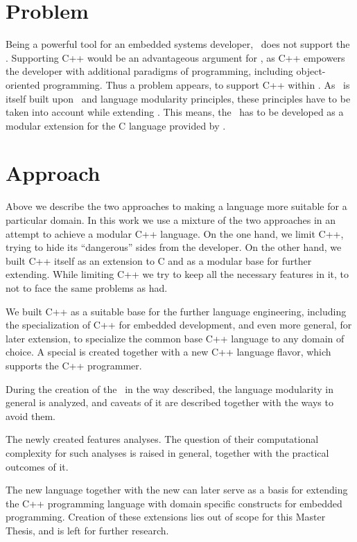 \section{Problem}

Being a powerful tool for an embedded systems developer, \mbdr\ does not support the \cpppl. Supporting C++ would be an
advantageous argument for \mbdr, as C++ empowers the developer with additional paradigms of programming, including 
object-oriented programming. Thus a problem appears, to support C++ within \mbdr. As \mbdr\ is itself built upon
\jbmps\ and language modularity principles, these principles have to be taken into account while extending \mbdr.
This means, the \cpppl\ has to be developed as a modular extension for the C language provided by \mbdr.


\section{Approach}

Above we describe the two approaches to making a language more suitable for a particular domain. In this work we use a mixture of 
the two approaches in an  attempt to achieve a modular C++ language. On the one hand, we limit C++, trying to hide its ``dangerous'' sides 
from the developer. On the other hand, we built C++ itself as an extension to C and as a modular base for further extending. While limiting 
C++ we try to keep all the necessary features in it, to not to face the same problems as  had.

We built C++ as a suitable base for the further language engineering, including the specialization  of C++ for embedded development, 
and even more general, for later extension, to specialize the common base C++ language to any domain of choice. A special  is created 
together with a new C++ language flavor, which supports the C++ programmer.

During the creation of the \cpppl\ in the way described, the language modularity in general is analyzed, and caveats of it
are described together with the ways to avoid them.

The newly created  features analyses. The question of their computational complexity for such analyses 
is raised in general, together with the practical outcomes of it.

The new language together with the new  can later serve as a basis for extending the C++ programming 
language with domain specific constructs for embedded programming. Creation of these extensions lies out of scope
for this Master Thesis, and is left for further research.


